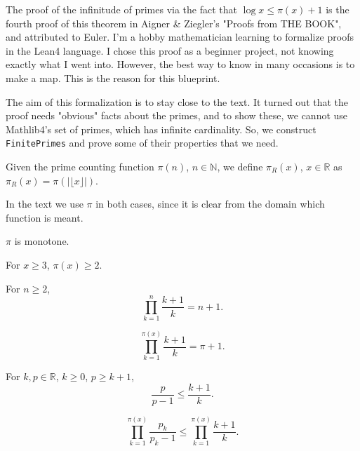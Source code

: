 The proof of the infinitude of primes via the fact that $\log x\le \pi(x)+1$ is the fourth proof of this theorem in Aigner & Ziegler's "Proofs from THE BOOK", and attributed to Euler. I'm a hobby mathematician learning to formalize proofs in the Lean4 language. I chose this proof as a beginner project, not knowing exactly what I went into. However,  the best way to know in many occasions is to make a map. This is the reason for this blueprint. 

The aim of this formalization is to stay close to the text. It turned out that the proof needs "obvious" facts about the primes, and to show these, we cannot use Mathlib4's set of primes, which has infinite cardinality. So, we construct \texttt{FinitePrimes} and prove some of their properties that we need.

\begin{definition-pre}
\label{def:piReal}
Given the prime counting function $\pi(n)$, $n\in\mathbb{N}$, we define $\pi_R(x)$, $x\in\mathbb{R}$ as $\pi_R(x) = \pi(|\lfloor x\rfloor|)$.

In the text we use $\pi$ in both cases, since it is clear from the domain which function is meant.
\end{definition-pre}

\begin{lemma}
\label{lem:lemma5-2-1}
$\pi$ is monotone.
\end{lemma}

\begin{lemma}
\label{lem:lemma5-2}
For $x\ge3$, $\pi(x)\ge2$.
\end{lemma}

\begin{lemma}
\label{lem:lemma5-1}
For $n\ge2$,
$$\prod_{k=1}^{n}\frac{k+1}{k} = n+1.$$
\end{lemma}

\begin{lemma}
\label{lem:lemma5}
$$\prod_{k=1}^{\pi(x)}\frac{k+1}{k} = \pi+1.$$
\end{lemma}

\begin{lemma}
\label{lem:lemma4-1}
For $k,p \in\mathbb{R}$, $k\ge0$, $p \ge k+1$,
$$\frac{p}{p-1} \le \frac{k+1}{k}.$$
\end{lemma}

\begin{lemma}
\label{lem:lemma4}
$$\prod_{k=1}^{\pi(x)}\frac{p_k}{p_k-1} \le \prod_{k=1}^{\pi(x)}\frac{k+1}{k}.$$
\end{lemma}

